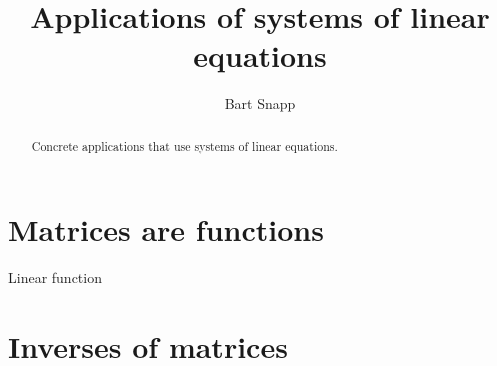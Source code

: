 \documentclass{ximera}
\author{Bart Snapp}
\title{Applications of systems of linear equations}
\begin{document}
\begin{abstract}
  Concrete applications that use systems of linear equations. 
\end{abstract}
\maketitle

\section{Matrices are functions}

\begin{definition}
  Linear function
\end{definition}



\section{Inverses of matrices}
\end{document}
